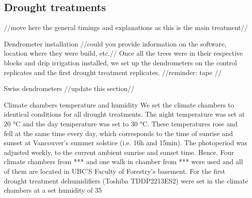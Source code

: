 \documentclass{article}
\begin{document}
	\subsection*{Drought treatments}
	//move here the general timings and explanations as this is the main treatment//
	
	Dendrometer installation //could you provide information on the software, location where they were build, etc.// 
	Once all the trees were in their respective blocks and drip irrigation installed, we set up the dendrometers on the control replicates and the first drought treatment replicates. 
	//reminder: tape //
	
	Swiss dendrometers
	//update this section//
	
	Climate chambers temperature and humidity
	We set the climate chambers to identical conditions for all drought treatments. The night temperature was set at 20 °C and the day temperature was set to 30 °C. These temperatures rose and fell at the same time every day, which corresponds to the time of sunrise and sunset at Vancouver’s summer solstice (i.e. 16h and 15min). The photoperiod was adjusted weekly, to the current ambient sunrise and sunset time. Hence. Four climate chambers from *** and one walk in chamber from *** were used and all of them are located in UBC’S Faculty of Forestry’s basement. For the first drought treatment dehumidifiers (Toshiba TDDP2213ES2) were set in the climate chambers at a set humidity of 35%
	
\end{document}

